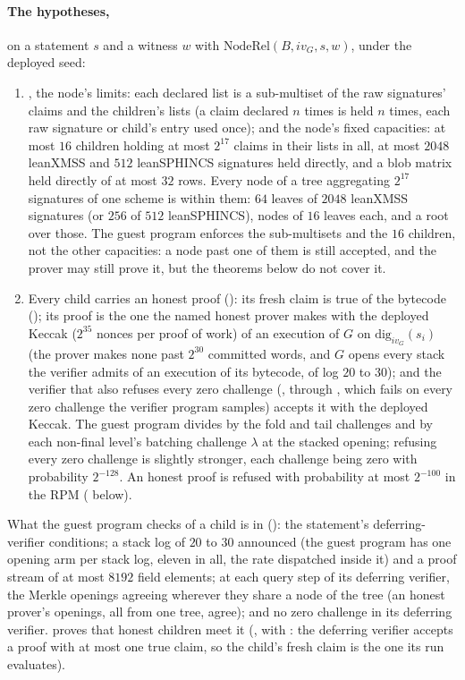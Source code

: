 \documentclass[11pt]{article}
\begin{document}
\paragraph{The hypotheses,} on a statement $s$ and a witness $w$ with
$\mathrm{NodeRel}(B, iv_G, s, w)$, under the deployed seed:
\begin{enumerate}
\item {}, the node's limits: each declared list
is a sub-multiset of the raw signatures' claims and the children's lists (a claim declared $n$ times
is held $n$ times, each raw signature or child's entry used once); and the node's fixed capacities: at most $16$ children holding at most $2^{17}$ claims in their lists in all, at most $2048$ leanXMSS and $512$ leanSPHINCS signatures held directly, and a blob matrix held directly of at most $32$ rows. Every node of a tree aggregating $2^{17}$ signatures of one scheme is within them: $64$ leaves of $2048$ leanXMSS signatures (or $256$ of $512$ leanSPHINCS), nodes of $16$ leaves each, and a root over those. The guest program enforces the sub-multisets and the $16$ children, not the other capacities: a node past one of them is still accepted, and the prover may still prove it, but the theorems below do not cover it.
\item Every child carries an honest proof (): its fresh claim is true of the
bytecode (); its proof is the one the named honest prover
 makes with the deployed Keccak
($2^{35}$ nonces per proof of work) of an execution of $G$ on $\mathrm{dig}_{iv_G}(s_i)$ (the
prover makes none past $2^{30}$ committed words, and $G$ opens every stack the verifier admits of an
execution of its bytecode, of log $20$ to $30$); and the verifier that also refuses
every zero challenge (, through
, which fails on every zero challenge the verifier
program samples) accepts it with the deployed Keccak. The guest program divides by the fold and tail
challenges and by each non-final level's batching challenge $\lambda$ at the stacked opening; refusing every zero
challenge is slightly stronger, each challenge being zero with probability $2^{-128}$. An honest
proof is refused with probability at most $2^{-100}$ in the RPM (
below).
\end{enumerate}
What the guest program checks of a child is in  (): the
statement's deferring-verifier conditions; a stack log of $20$ to $30$ announced (the guest program
has one opening arm per stack log, eleven in all, the rate dispatched inside it) and a proof stream of at most $8192$ field
elements; at each query step of its deferring verifier, the Merkle openings agreeing wherever they
share a node of the tree (an honest prover's openings, all from one tree, agree); and no zero
challenge in its deferring verifier.  proves that honest children meet it
(, with : the deferring verifier accepts a proof
with at most one true claim, so the child's fresh claim is the one its run evaluates).
\end{document}
